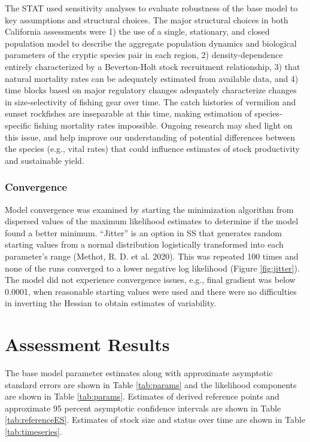\documentclass[
  english,
  a4paper,
]{article}
\begin{document}
The STAT used sensitivity analyses to evaluate robustness of the base model to key assumptions and structural choices. The major structural choices in both California assessments were 1) the use of a single, stationary, and closed population model to describe the aggregate population dynamics and biological parameters of the cryptic species pair in each region, 2) density-dependence entirely characterized by a Beverton-Holt stock recruitment relationship, 3) that natural mortality rates can be adequately estimated from available data, and 4) time blocks based on major regulatory changes adequately characterize changes in size-selectivity of fishing gear over time. The catch histories of vermilion and sunset rockfishes are inseparable at this time, making estimation of species-specific fishing mortality rates impossible. Ongoing research may shed light on this issue, and help improve our understanding of potential differences between the species (e.g., vital rates) that could influence estimates of stock productivity and sustainable yield.

\hypertarget{convergence}{%
\subsubsection{Convergence}\label{convergence}}

Model convergence was examined by starting the minimization algorithm from dispersed
values of the maximum likelihood estimates to determine if the model found a better
minimum. ``Jitter'' is an option in SS that generates random starting values from a normal
distribution logistically transformed into each parameter's range (Methot, R. D. et al. 2020). This
was repeated 100 times and none of the runs converged to a lower negative log likelihood (Figure \ref{fig:jitter}).
The model did not experience convergence issues, e.g., final gradient was below 0.0001,
when reasonable starting values were used and there were no difficulties in inverting
the Hessian to obtain estimates of variability.

\hypertarget{assessment-results}{%
\section{Assessment Results}\label{assessment-results}}

The base model parameter estimates along with approximate asymptotic standard errors are shown in Table \ref{tab:params} and the likelihood components are shown in Table \ref{tab:params}. Estimates of derived reference points and approximate 95 percent asymptotic confidence intervals are shown in Table \ref{tab:referenceES}. Estimates of stock size and status over time are shown in Table \ref{tab:timeseries}.
\end{document}
